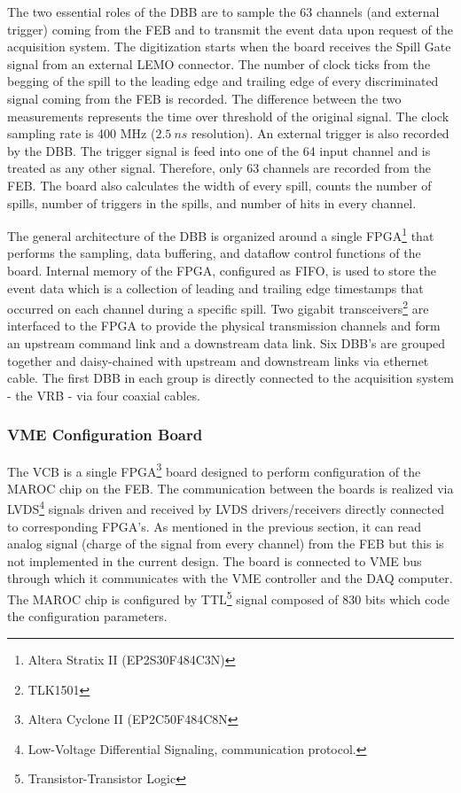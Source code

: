 \documentclass[a4paper,11pt]{article}
\begin{document}
The two essential roles of the DBB are to sample the 63 channels (and external trigger) coming from the FEB and to transmit the event data upon request
of the acquisition system. The digitization starts when the board receives the Spill Gate signal from an external LEMO connector. The number of clock
ticks from the begging of the spill to the leading edge and trailing edge of every discriminated signal coming from the FEB is recorded. The difference
between the two measurements represents the time over threshold of the original signal. The clock sampling rate is 400 MHz ($2.5 \ ns$ resolution). An
external trigger is also recorded by the DBB. The trigger signal is feed into one of the 64 input channel and is treated as any other signal. Therefore,
only 63 channels are recorded from the FEB. The board also calculates the width of every spill, counts the number of spills, number of triggers in the
spills, and number of hits in every channel.

The general architecture of the DBB is organized around a single FPGA\footnote{Altera Stratix II (EP2S30F484C3N)} that performs the sampling, data
buffering, and dataflow control functions of the board. Internal memory of the FPGA, configured as FIFO, is used to store the event data which is
a collection of leading and trailing edge timestamps that occurred on each channel during a specific spill. Two gigabit transceivers\footnote{TLK1501}
are interfaced to the FPGA to provide the physical transmission channels and form an upstream command link and a downstream data link. Six DBB's are
grouped together and daisy-chained with upstream and downstream links via ethernet cable. The first DBB in each group is directly connected to the
acquisition system - the VRB - via four coaxial cables.

\subsubsection{VME Configuration Board}
The VCB is a single FPGA\footnote{Altera Cyclone II (EP2C50F484C8N} board designed to perform configuration of the MAROC chip on the FEB. The
communication between the boards is realized via LVDS\footnote{Low-Voltage Differential Signaling, communication protocol.} signals driven and received
by LVDS drivers/receivers directly connected to corresponding FPGA's. As mentioned in the previous section, it can read analog signal (charge of the signal
from every channel) from the FEB but this is not implemented in the current design. The board is connected to VME bus through which it communicates with
the VME controller and the DAQ computer. The MAROC chip is configured by TTL\footnote{Transistor-Transistor Logic} signal composed of 830 bits which code
the configuration parameters.
\end{document}
